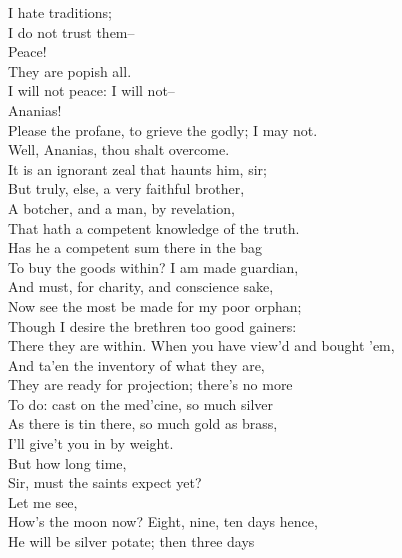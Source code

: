 \documentclass{memoir}
\begin{document}
\begin{drama*}
\ananiasspeaks {} I hate traditions;\\
 I do not trust them--\\
\tribulationspeaks {} Peace!\\
\ananiasspeaks {} They are popish all.\\
 I will not peace: I will not--\\
\tribulationspeaks {} Ananias!\\
\ananiasspeaks  Please the profane, to grieve the godly; I may not.\\
\subtlespeaks  Well, Ananias, thou shalt overcome.\\
\tribulationspeaks  It is an ignorant zeal that haunts him, sir;\\
 But truly, else, a very faithful brother,\\
 A botcher, and a man, by revelation,\\
 That hath a competent knowledge of the truth.\\
\subtlespeaks  Has he a competent sum there in the bag\\
 To buy the goods within? I am made guardian,\\
 And must, for charity, and conscience sake,\\
 Now see the most be made for my poor orphan;\\
 Though I desire the brethren too good gainers:\\
 There they are within. When you have view'd and bought 'em,\\
 And ta'en the inventory of what they are,\\
 They are ready for projection; there's no more\\
 To do: cast on the med'cine, so much silver\\
 As there is tin there, so much gold as brass,\\
 I'll give't you in by weight.\\
\tribulationspeaks {} But how long time,\\
 Sir, must the saints expect yet?\\
\subtlespeaks {} Let me see,\\
 How's the moon now? Eight, nine, ten days hence,\\
 He will be silver potate; then three days\\

\end{drama*}
\end{document}
